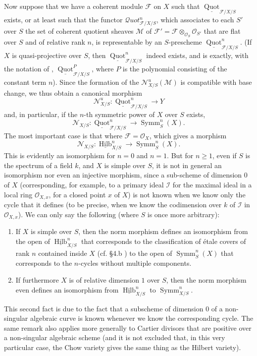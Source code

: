   Now suppose that we have a coherent module $\mathcal{F}$ on $X$ such that $\underline{\operatorname{Quot}}_{\mathcal{F}/X/S}$ exists, or at least such that the functor $\mathcal{Q}uot_{\mathcal{F}/X/S}^n$, which associates to each $S'$ over $S$ the set of coherent quotient sheaves $\mathcal{M}$ of $\mathcal{F}'=\mathcal{F}\otimes_{\mathcal{O}_S}\mathcal{O}_{S'}$ that are flat over $S$ and of relative rank $n$, is representable by an $S$-prescheme $\underline{\operatorname{Quot}}_{\mathcal{F}/X/S}^n$.
  (If $X$ is quasi-projective over $S$, then $\underline{\operatorname{Quot}}_{\mathcal{F}/X/S}^n$ indeed exists, and is exactly, with the notation of , $\underline{\operatorname{Quot}}_{\mathcal{F}/X/S}^P$, where $P$ is the polynomial consisting of the constant term $n$).
  Since the formation of the $\mathcal{N}_{X/S}^u(\mathcal{M})$ is compatible with base change, we thus obtain a canonical morphism
  \[
    \mathcal{N}_{X/S}^u\colon \underline{\operatorname{Quot}}_{\mathcal{F}/X/S}^n \to Y
  \]
  and, in particular, if the $n$-th symmetric power of $X$ over $S$ exists,
  \[
    \mathcal{N}_{X/S}\colon \underline{\operatorname{Quot}}_{\mathcal{F}/X/S}^n \to \operatorname{Symm}_S^n(X).
  \]
  The most important case is that where $\mathcal{F}=\mathcal{O}_X$, which gives a morphism
  \[
    \mathcal{N}_{X/S}\colon \underline{\operatorname{Hilb}}_{X/S}^n \to \operatorname{Symm}_S^n(X).
  \]
  This is evidently an isomorphism for $n=0$ and $n=1$.
  But for $n\geqslant1$, even if $S$ is the spectrum of a field $k$, and $X$ is simple over $S$, it is not in general an isomorphism nor even an injective morphism, since a sub-scheme of dimension $0$ of $X$ (corresponding, for example, to a primary ideal $\mathcal{I}$ for the maximal ideal in a local ring $\mathcal{O}_{X,x}$, for a closed point $x$ of $X$) is not known when we know only the cycle that it defines (to be precise, when we know the codimension over $k$ of $\mathcal{I}$ in $\mathcal{O}_{X,x}$).
  We can only say the following (where $S$ is once more arbitrary):

  \begin{enumerate}[label=\alph*.]
    \item If $X$ is simple over $S$, then the norm morphism defines an isomorphism from the open of $\underline{\operatorname{Hilb}}_{X/S}^n$ that corresponds to the classification of étale covers of rank $n$ contained inside $X$ (cf. §4.b ) to the open of $\operatorname{Symm}_S^n(X)$ that corresponds to the $n$-cycles without multiple components.
    \item If furthermore $X$ is of relative dimension $1$ over $S$, then the norm morphism even defines an isomorphism from $\underline{\operatorname{Hilb}}_{X/S}^n$ to $\operatorname{Symm}_{X/S}^n$.
  \end{enumerate}

  This second fact is due to the fact that a subscheme of dimension $0$ of a non-singular algebraic curve is known whenever we know the corresponding cycle.
  The same remark also applies more generally to Cartier divisors that are positive over a non-singular algebraic scheme (and it is not excluded that, in this very particular case, the Chow variety gives the same thing as the Hilbert variety).
